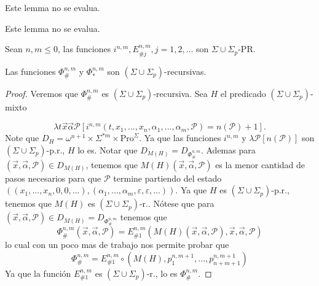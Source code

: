  \begin{lemma}
    \par Este lemma no se evalua.
  \end{lemma}
  
  \begin{lemma}
    \par Este lemma no se evalua.
  \end{lemma}

  \begin{proposition}
    Sean $n, m \leq 0$, las funciones $i^{n, m}, E_{\#j}^{n, m}, j = 1, 2, ...$ son $\Sigma \cup \Sigma_{p}$-PR.
  \end{proposition}

  \begin{theorem}
    Las funciones \(\Phi _{\#}^{n,m}\) y \(\Phi _{\ast }^{n,m}\) son \((\Sigma \cup \Sigma _{p})\)-recursivas.

  \begin{proof}
    Veremos que \(\Phi _{\#}^{n,m}\) es \((\Sigma \cup \Sigma _{p})\)-recursiva. Sea \(H\) el predicado
    \((\Sigma \cup \Sigma _{p})\)-mixto

    \[
      \displaystyle \lambda t\vec{x}\vec{\alpha}\mathcal{P}\left[ i^{n,m}(t,x_{1},...,x_{n}, \alpha _{1},...,\alpha _{m},
      \mathcal{P})=n(\mathcal{P})+1\right] \text{.}
    \]
    Note que \(D_{H}=\omega ^{n+1}\times \Sigma ^{\ast m}\times \mathrm{Pro} ^{\Sigma }\).
    Ya que las funciones \(i^{n,m}\) y \(\lambda \mathcal{P}\left[ n( \mathcal{P})\right] \) son 
    \((\Sigma \cup \Sigma _{p})\)-p.r., \(H\) lo es. Notar que \(D_{M(H)}=D_{\Phi _{\#}^{n,m}}\).
    Ademas para \((\vec{x},\vec{\alpha}, \mathcal{P})\in D_{M(H)}\), tenemos que \(M(H)(\vec{x},\vec{\alpha},
    \mathcal{P} )\) es la menor cantidad de pasos necesarios para que \(\mathcal{P}\) termine partiendo del estado 
    \(((x_{1},...,x_{n},0,0,...),(\alpha _{1},...,\alpha _{m},\varepsilon ,\varepsilon ,...))\).
    Ya que \(H\) es \((\Sigma \cup \Sigma _{p})\)-p.r., tenemos que \(M(H)\) es \((\Sigma \cup \Sigma _{p})\)-r..
    Nótese que para \((\vec{x},\vec{\alpha},\mathcal{P})\in D_{M(H)}=D_{\Phi _{\#}^{n,m}} \) tenemos que
    \[
      \displaystyle \Phi _{\#}^{n,m}(\vec{x},\vec{\alpha},\mathcal{P})=E_{\#1}^{n,m}\left( M(H)( \vec{x},\vec{\alpha},
      \mathcal{P}),\vec{x},\vec{\alpha},\mathcal{P}\right)
    \]
    lo cual con un poco mas de trabajo nos permite probar que
    \[
      \displaystyle \Phi _{\#}^{n,m}=E_{\#1}^{n,m}\circ \left( M(H),p_{1}^{n,m+1},...,p_{n+m+1}^{n,m+1}\right)
    \]
    Ya que la función \(E_{\#1}^{n,m}\) es \((\Sigma \cup \Sigma _{p})\)-r., lo es \( \Phi _{\#}^{n,m}\).
  \end{proof}
  \end{theorem}



